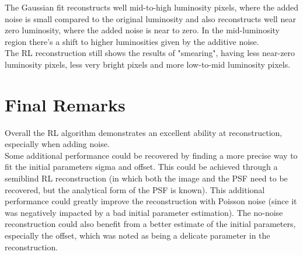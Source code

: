 \documentclass[a4paper]{article}
\begin{document}
\begin{multicols}{2}
			The Gaussian fit reconstructs well mid-to-high luminosity pixels, where the added noise is small compared to the original luminosity and also reconstructs well near zero luminosity, where the added noise is near to zero. In the mid-luminosity region there's a shift to higher luminosities given by the additive noise.\\
			
			The RL reconstruction still shows the results of "smearing", having less near-zero luminosity pixels, less very bright pixels and more low-to-mid luminosity pixels.	
	\end{multicols}

	\vspace{0.035\textheight}

	\section{Final Remarks}
		Overall the RL algorithm demonstrates an excellent ability at reconstruction, especially when adding noise.\\
		
		Some additional performance could be recovered by finding a more precise way to fit the initial parameters sigma and offset. This could be achieved through a semiblind RL reconstruction (in which both the image and the PSF need to be recovered, but the analytical form of the PSF is known). This additional performance could greatly improve the reconstruction with Poisson noise (since it was negatively impacted by a bad initial parameter estimation). The no-noise reconstruction could also benefit from a better estimate of the initial parameters, especially the offset, which was noted as being a delicate parameter in the reconstruction.\\
		
	\newpage
\end{document}
